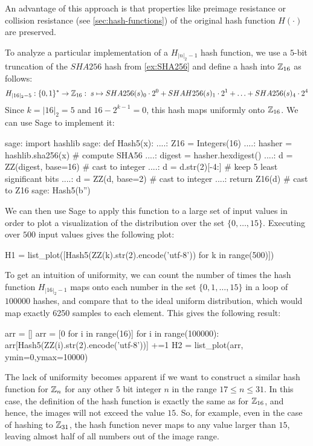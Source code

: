 An advantage of this approach is that properties like preimage resistance or collision resistance (see \secname{} \ref{sec:hash-functions}) of the original hash function $H(\cdot)$ are preserved.
\begin{example} To analyze a particular implementation of a $H_{|n|_2-1}$ hash function, we use a $5$-bit truncation of the $SHA256$ hash from \examplename{} \ref{ex:SHA256} and define a hash into $\mathbb{Z}_{16}$ as follows:
$$
H_{|16|_2-5}: \{0,1\}^* \to \mathbb{Z}_{16}:\; s\mapsto
SHA256(s)_0\cdot 2^0 + SHAH256(s)_1\cdot 2^1 + \ldots + SHA256(s)_4\cdot 2^4
$$
Since $k=|16|_2=5$ and $16-2^{k-1}=0$, this hash maps uniformly onto $\mathbb{Z}_{16}$. We can use Sage to implement it:
\begin{sagecommandline}
sage: import hashlib
sage: def Hash5(x):
....:     Z16 = Integers(16)
....:     hasher = hashlib.sha256(x) # compute SHA56
....:     digest = hasher.hexdigest()
....:     d = ZZ(digest, base=16) # cast to integer
....:     d = d.str(2)[-4:] # keep 5 least significant bits
....:     d = ZZ(d, base=2) # cast to integer
....:     return Z16(d) # cast to Z16
sage: Hash5(b'')
\end{sagecommandline}
We can then use Sage to apply this function to a large set of input values in order to plot a visualization of the distribution over the set $\{0,\ldots,15\}$. Executing over $500$ input values gives the following plot:
\begin{sagesilent}
H1 = list_plot([Hash5(ZZ(k).str(2).encode('utf-8')) for k in range(500)])
\end{sagesilent}
\begin{center}
\end{center}
To get an intuition of uniformity, we can count the number of times the hash function $H_{|16|_2-1}$ maps onto each number in the set $\{0,1,\ldots,15\}$ in a loop of $100000$ hashes, and compare that to the ideal uniform distribution, which would map exactly 6250 samples to each element. This gives the following result:
\begin{sagesilent}
arr = []
arr = [0 for i in range(16)]
for i in range(100000):
    arr[Hash5(ZZ(i).str(2).encode('utf-8'))] +=1
H2 = list_plot(arr, ymin=0,ymax=10000)
\end{sagesilent}
\begin{center}
\end{center}
The lack of uniformity becomes apparent if we want to construct a similar hash function for $\mathbb{Z}_n$ for any other $5$ bit integer $n$ in the range $17\leq n \leq 31$. In this case, the definition of the hash function is exactly the same as for $\mathbb{Z}_{16}$, and hence, the images will not exceed the value $15$. So, for example, even in the case of hashing to $\mathbb{Z}_{31}$, the hash function never maps to any value larger than $15$, leaving almost half of all numbers out of the image range.

\end{example}

